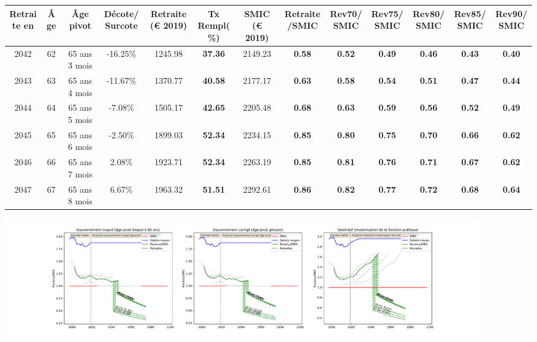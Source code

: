 { \scriptsize \begin{center} 
\begin{tabular}[htb]{|c|c||c|c||c|c||c||c|c|c|c|c|c|} 
\hline 
 Retraite en &  Âge &  Âge pivot &  Décote/Surcote &  Retraite (\euro{} 2019) &  Tx Rempl(\%) &  SMIC (\euro{} 2019) &  Retraite/SMIC &  Rev70/SMIC &  Rev75/SMIC &  Rev80/SMIC &  Rev85/SMIC &  Rev90/SMIC \\ 
\hline \hline 
 2042 &  62 &  65 ans 3 mois &  -16.25\% &  1245.98 &  {\bf 37.36} &  2149.23 &  {\bf {\color{red} 0.58}} &  {\bf {\color{red} 0.52}} &  {\bf {\color{red} 0.49}} &  {\bf {\color{red} 0.46}} &  {\bf {\color{red} 0.43}} &  {\bf {\color{red} 0.40}} \\ 
\hline 
 2043 &  63 &  65 ans 4 mois &  -11.67\% &  1370.77 &  {\bf 40.58} &  2177.17 &  {\bf {\color{red} 0.63}} &  {\bf {\color{red} 0.58}} &  {\bf {\color{red} 0.54}} &  {\bf {\color{red} 0.51}} &  {\bf {\color{red} 0.47}} &  {\bf {\color{red} 0.44}} \\ 
\hline 
 2044 &  64 &  65 ans 5 mois &  -7.08\% &  1505.17 &  {\bf 42.65} &  2205.48 &  {\bf {\color{red} 0.68}} &  {\bf {\color{red} 0.63}} &  {\bf {\color{red} 0.59}} &  {\bf {\color{red} 0.56}} &  {\bf {\color{red} 0.52}} &  {\bf {\color{red} 0.49}} \\ 
\hline 
 2045 &  65 &  65 ans 6 mois &  -2.50\% &  1899.03 &  {\bf 52.34} &  2234.15 &  {\bf {\color{red} 0.85}} &  {\bf {\color{red} 0.80}} &  {\bf {\color{red} 0.75}} &  {\bf {\color{red} 0.70}} &  {\bf {\color{red} 0.66}} &  {\bf {\color{red} 0.62}} \\ 
\hline 
 2046 &  66 &  65 ans 7 mois &  2.08\% &  1923.71 &  {\bf 52.34} &  2263.19 &  {\bf {\color{red} 0.85}} &  {\bf {\color{red} 0.81}} &  {\bf {\color{red} 0.76}} &  {\bf {\color{red} 0.71}} &  {\bf {\color{red} 0.67}} &  {\bf {\color{red} 0.62}} \\ 
\hline 
 2047 &  67 &  65 ans 8 mois &  6.67\% &  1963.32 &  {\bf 51.51} &  2292.61 &  {\bf {\color{red} 0.86}} &  {\bf {\color{red} 0.82}} &  {\bf {\color{red} 0.77}} &  {\bf {\color{red} 0.72}} &  {\bf {\color{red} 0.68}} &  {\bf {\color{red} 0.64}} \\ 
\hline 
\hline 
\end{tabular} 
\end{center} } 

 \begin{center}\includegraphics[width=0.9\textwidth]{fig/AdjTech_1980_22_dest_retraite.pdf}\end{center} \label{fig/AdjTech_1980_22_dest_retraite.pdf} 

